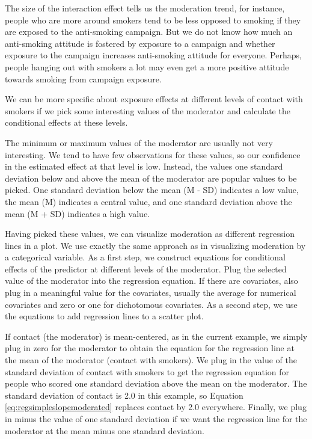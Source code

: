 \documentclass[a4paper]{book}
\theoremstyle{definition}
\theoremstyle{definition}
\theoremstyle{definition}
\theoremstyle{remark}
\begin{document}
The size of the interaction effect tells us the moderation trend, for
instance, people who are more around smokers tend to be less opposed to
smoking if they are exposed to the anti-smoking campaign. But we do not
know how much an anti-smoking attitude is fostered by exposure to a
campaign and whether exposure to the campaign increases anti-smoking
attitude for everyone. Perhaps, people hanging out with smokers a lot
may even get a more positive attitude towards smoking from campaign
exposure.

We can be more specific about exposure effects at different levels of
contact with smokers if we pick some interesting values of the moderator
and calculate the conditional effects at these levels.

The minimum or maximum values of the moderator are usually not very
interesting. We tend to have few observations for these values, so our
confidence in the estimated effect at that level is low. Instead, the
values one standard deviation below and above the mean of the moderator
are popular values to be picked. One standard deviation below the mean
(M - SD) indicates a low value, the mean (M) indicates a central value,
and one standard deviation above the mean (M + SD) indicates a high
value.

Having picked these values, we can visualize moderation as different
regression lines in a plot. We use exactly the same approach as in
visualizing moderation by a categorical variable. As a first step, we
construct equations for conditional effects of the predictor at
different levels of the moderator. Plug the selected value of the
moderator into the regression equation. If there are covariates, also
plug in a meaningful value for the covariates, usually the average for
numerical covariates and zero or one for dichotomous covariates. As a
second step, we use the equations to add regression lines to a scatter
plot.

If contact (the moderator) is mean-centered, as in the current example,
we simply plug in zero for the moderator to obtain the equation for the
regression line at the mean of the moderator (contact with smokers). We
plug in the value of the standard deviation of contact with smokers to
get the regression equation for people who scored one standard deviation
above the mean on the moderator. The standard deviation of contact is
2.0 in this example, so Equation \eqref{eq:regsimpleslopemoderated}
replaces contact by 2.0 everywhere. Finally, we plug in minus the value
of one standard deviation if we want the regression line for the
moderator at the mean minus one standard deviation.
\end{document}
